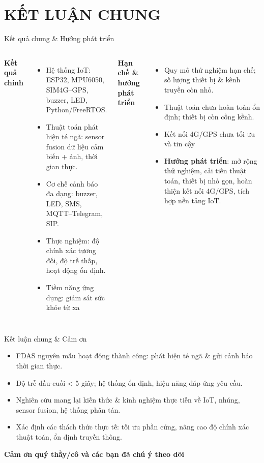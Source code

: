 \section{KẾT LUẬN CHUNG}
\begin{frame}{Kết quả chung \& Hướng phát triển}
\begin{columns}[T]
    \textbf{Kết quả chính}
    \begin{itemize}
        \item Hệ thống IoT: ESP32, MPU6050, SIM4G--GPS, buzzer, LED, Python/FreeRTOS.
        \item Thuật toán phát hiện té ngã: sensor fusion dữ liệu cảm biến + ảnh, thời gian thực.
        \item Cơ chế cảnh báo đa dạng: buzzer, LED, SMS, MQTT--Telegram, SIP.
        \item Thực nghiệm: độ chính xác tương đối, độ trễ thấp, hoạt động ổn định.
        \item Tiềm năng ứng dụng: giám sát sức khỏe từ xa
    \end{itemize}

    \textbf{Hạn chế \& hướng phát triển}
    \begin{itemize}
        \item Quy mô thử nghiệm hạn chế; số lượng thiết bị & kênh truyền còn nhỏ.
        \item Thuật toán chưa hoàn toàn ổn định; thiết bị còn cồng kềnh.
        \item Kết nối 4G/GPS chưa tối ưu và tin cậy
        \item \textbf{Hướng phát triển}: mở rộng thử nghiệm, cải tiến thuật toán, thiết bị nhỏ gọn, hoàn thiện kết nối 4G/GPS, tích hợp nền tảng IoT.
    \end{itemize}
\end{columns}
\end{frame}

\begin{frame}{Kết luận chung \& Cảm ơn}
\begin{itemize}
    \item FDAS nguyên mẫu hoạt động thành công: phát hiện té ngã & gửi cảnh báo thời gian thực.
    \item Độ trễ đầu-cuối < 5 giây; hệ thống ổn định, hiệu năng đáp ứng yêu cầu.
    \item Nghiên cứu mang lại kiến thức & kinh nghiệm thực tiễn về IoT, nhúng, sensor fusion, hệ thống phân tán.
    \item Xác định các thách thức thực tế: tối ưu phần cứng, nâng cao độ chính xác thuật toán, ổn định truyền thông.
\end{itemize}

\vspace{0.5cm}
\centering
\textbf{Cảm ơn quý thầy/cô và các bạn đã chú ý theo dõi}
\end{frame}
